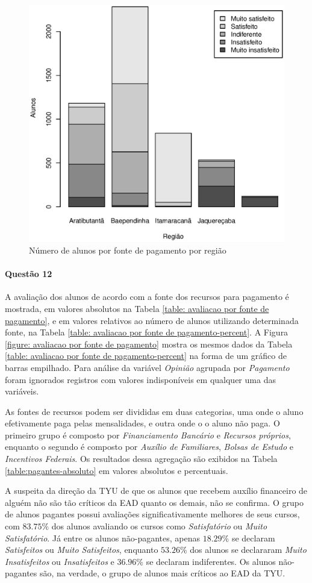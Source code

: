 \documentclass[10pt,a4paper,oneside]{article}
\begin{document}
\begin{figure}[!h]
	\centering
	\includegraphics[width=.65\linewidth]{plots/stacked_pagamento_por_regiao.eps}
	\caption{Número de alunos por fonte de pagamento por região}
	\label{fig:fonte de pagamento absoluto}
\end{figure}

\FloatBarrier
\paragraph{Questão 12}

A avaliação dos alunos de acordo com a fonte dos recursos para pagamento é mostrada, em valores absolutos na Tabela \ref{table: avaliacao por fonte de pagamento}, e em valores relativos ao número de alunos utilizando determinada fonte, na Tabela \ref{table: avaliacao por fonte de pagamento-percent}. A Figura \ref{figure: avaliacao por fonte de pagamento} mostra os mesmos dados da Tabela \ref{table: avaliacao por fonte de pagamento-percent} na forma de um gráfico de barras empilhado. Para análise da variável \textit{Opinião} agrupada por \textit{Pagamento} foram ignorados registros com valores indisponíveis em qualquer uma das variáveis. 

As fontes de recursos podem ser divididas em duas categorias, uma onde o aluno efetivamente paga pelas mensalidades, e outra onde o o aluno não paga. O primeiro grupo é composto por \textit{Financiamento Bancário} e \textit{Recursos próprios}, enquanto o segundo é composto por \textit{Auxílio de Familiares}, \textit{Bolsas de Estudo} e \textit{Incentivos Federais}. Os resultados dessa agregação são exibidos na Tabela \ref{table:pagantes-absoluto} em valores absolutos e percentuais.

A suspeita da direção da TYU de que os alunos que recebem auxílio financeiro de alguém não são tão críticos da EAD quanto os demais, não se confirma. O grupo de alunos pagantes possui avaliações significativamente melhores de seus cursos, com $83.75\%$ dos alunos avaliando os cursos como \textit{Satisfatório} ou \textit{Muito Satisfatório}. Já entre os alunos não-pagantes, apenas $18.29\%$ se declaram \textit{Satisfeitos} ou \textit{Muito Satisfeitos}, enquanto $53.26\%$ dos alunos se declararam \textit{Muito Insatisfeitos} ou \textit{Insatisfeitos} e $36.96\%$ se declaram indiferentes. Os alunos não-pagantes são, na verdade, o grupo de alunos mais críticos ao EAD da TYU.
\end{document}
